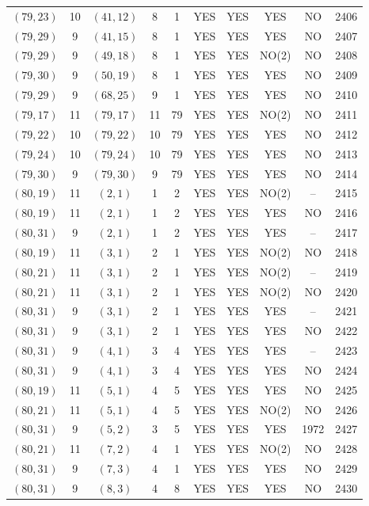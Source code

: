 \begin{longtable}{|c|c|c|c|c|c|c|c|c|c|}
$(79, 23)$ & 10 & $(41, 12)$ & 8 & 1 & YES & YES & YES & NO & 2406\\
$(79, 29)$ & 9 & $(41, 15)$ & 8 & 1 & YES & YES & YES & NO & 2407\\
$(79, 29)$ & 9 & $(49, 18)$ & 8 & 1 & YES & YES & NO(2) & NO & 2408\\
$(79, 30)$ & 9 & $(50, 19)$ & 8 & 1 & YES & YES & YES & NO & 2409\\
$(79, 29)$ & 9 & $(68, 25)$ & 9 & 1 & YES & YES & YES & NO & 2410\\
$(79, 17)$ & 11 & $(79, 17)$ & 11 & 79 & YES & YES & NO(2) & NO & 2411\\
$(79, 22)$ & 10 & $(79, 22)$ & 10 & 79 & YES & YES & YES & NO & 2412\\
$(79, 24)$ & 10 & $(79, 24)$ & 10 & 79 & YES & YES & YES & NO & 2413\\
$(79, 30)$ & 9 & $(79, 30)$ & 9 & 79 & YES & YES & YES & NO & 2414\\
$(80, 19)$ & 11 & $(2, 1)$ & 1 & 2 & YES & YES & NO(2) & -- & 2415\\
$(80, 19)$ & 11 & $(2, 1)$ & 1 & 2 & YES & YES & YES & NO & 2416\\
$(80, 31)$ & 9 & $(2, 1)$ & 1 & 2 & YES & YES & YES & -- & 2417\\
$(80, 19)$ & 11 & $(3, 1)$ & 2 & 1 & YES & YES & NO(2) & NO & 2418\\
$(80, 21)$ & 11 & $(3, 1)$ & 2 & 1 & YES & YES & NO(2) & -- & 2419\\
$(80, 21)$ & 11 & $(3, 1)$ & 2 & 1 & YES & YES & NO(2) & NO & 2420\\
$(80, 31)$ & 9 & $(3, 1)$ & 2 & 1 & YES & YES & YES & -- & 2421\\
$(80, 31)$ & 9 & $(3, 1)$ & 2 & 1 & YES & YES & YES & NO & 2422\\
$(80, 31)$ & 9 & $(4, 1)$ & 3 & 4 & YES & YES & YES & -- & 2423\\
$(80, 31)$ & 9 & $(4, 1)$ & 3 & 4 & YES & YES & YES & NO & 2424\\
$(80, 19)$ & 11 & $(5, 1)$ & 4 & 5 & YES & YES & YES & NO & 2425\\
$(80, 21)$ & 11 & $(5, 1)$ & 4 & 5 & YES & YES & NO(2) & NO & 2426\\
$(80, 31)$ & 9 & $(5, 2)$ & 3 & 5 & YES & YES & YES & 1972 & 2427\\
$(80, 21)$ & 11 & $(7, 2)$ & 4 & 1 & YES & YES & NO(2) & NO & 2428\\
$(80, 31)$ & 9 & $(7, 3)$ & 4 & 1 & YES & YES & YES & NO & 2429\\
$(80, 31)$ & 9 & $(8, 3)$ & 4 & 8 & YES & YES & YES & NO & 2430\\

\end{longtable}
